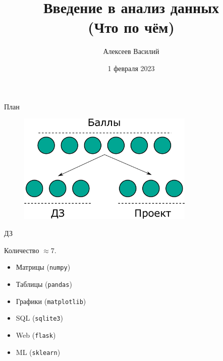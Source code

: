 \documentclass[russian]{beamer}
\title[Advanced Python 2]
{Введение в анализ данных\\
{\normalsize (Что по чём)}}
\subtitle{}
\author[Василий А.]{
  Алексеев Василий
}
\institute[]
{
  МФТИ
}
\date[2023]
{
  \footnotesize{1 февраля 2023}
}
\begin{document}
  \frame{\titlepage}
  
  \begin{frame}{План}
    \begin{figure}
      \centering
      \includegraphics[width=0.75\textwidth]{scheme}
    \end{figure}
  \end{frame}
  
  \begin{frame}{ДЗ}
  
    \pause
    
    Количество $\approx 7$.
    
    \pause
  
    \begin{itemize}
      \item Матрицы (\texttt{numpy})
        \pause
      \item Таблицы (\texttt{pandas})
        \pause
      \item Графики (\texttt{matplotlib})
        \pause
      \item SQL (\texttt{sqlite3})
        \pause
      \item Web (\texttt{flask})
        \pause
      \item ML (\texttt{sklearn})
    \end{itemize}
  \end{frame}
  
\end{document}
